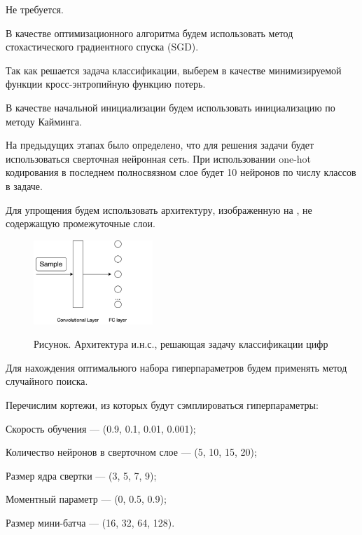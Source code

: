 \begin{textitemize}
\item Не требуется.

\item В качестве оптимизационного алгоритма будем использовать метод стохастического градиентного спуска (SGD).

\item Так как решается задача классификации, выберем в качестве минимизируемой функции кросс-энтропийную функцию потерь.

\item В качестве начальной инициализации будем использовать инициализацию по методу Кайминга.

\item На предыдущих этапах было определено, что для решения задачи будет использоваться сверточная нейронная сеть. При использовании one-hot кодирования в последнем полносвязном слое будет 10 нейронов по числу классов в задаче.

Для упрощения будем использовать архитектуру, изображенную на \textit{}, не содержащую промежуточные слои.

\begin{figure}[H]
	\caption{Рисунок. Архитектура и.н.с., решающая задачу классификации цифр}
	\includegraphics[width=0.4\textwidth]{author/part3/figures/model.png}
	\label{fig:model}
\end{figure}

Для нахождения оптимального набора гиперпараметров будем применять метод случайного поиска.

Перечислим кортежи, из которых будут сэмплироваться гиперпараметры:
\begin{textitemize}
	\item Скорость обучения --- (0.9, 0.1, 0.01, 0.001);
	\item Количество нейронов в сверточном слое --- (5, 10, 15, 20);
	\item Размер ядра свертки --- (3, 5, 7, 9);
	\item Моментный параметр --- (0, 0.5, 0.9);
	\item Размер мини-батча --- (16, 32, 64, 128).
\end{textitemize}


\end{textitemize}
